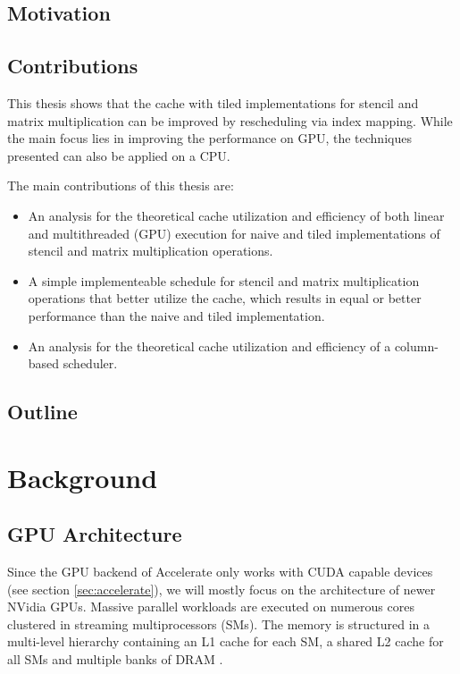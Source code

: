 \documentclass{article}
\newcommand{\TODO}[1]{\noindent{\color{red}\textbf{[TODO] #1}}}
\begin{document}
\subsection{Motivation}



\subsection{Contributions}
This thesis shows that the cache with tiled implementations for stencil and matrix multiplication can be improved by rescheduling via index mapping.
While the main focus lies in improving the performance on GPU, the techniques presented can also be applied on a CPU.

\vspace{1em}
The main contributions of this thesis are:
\begin{itemize}
    \item An analysis for the theoretical cache utilization and efficiency of both linear and multithreaded (GPU) execution for naive and tiled implementations of stencil and matrix multiplication operations.
    \item A simple implementeable schedule for stencil and matrix multiplication operations that better utilize the cache, which results in equal or better performance than the naive and tiled implementation.
    \item An analysis for the theoretical cache utilization and efficiency of a column-based scheduler.
\end{itemize}

\subsection{Outline}
\TODO{Chapter x introduces yada, yada}

\section{Background}

\subsection{GPU Architecture}
Since the GPU backend of Accelerate only works with CUDA capable devices (see section \ref{sec:accelerate}), we will mostly focus on the architecture of newer NVidia GPUs.
Massive parallel workloads are executed on numerous cores clustered in streaming multiprocessors (SMs).
The memory is structured in a multi-level hierarchy containing an L1 cache for each SM, a shared L2 cache for all SMs and multiple banks of DRAM \cite{nvidia2017volta,nvidia2020ampere}.
\end{document}
